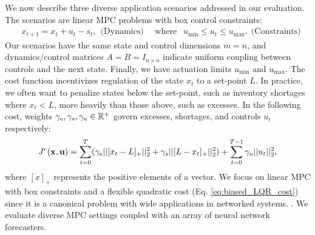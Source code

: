 We now describe three diverse application scenarios addressed in our evaluation. The scenarios
are linear MPC problems with box control constraints:
\begin{align}
    & x_{t+1} = x_{t} + u_t - s_t, ~~\text{(Dynamics)}  \quad{\text{~where~}} ~~
    u_{\text{min}} \leq u_t \leq u_{\text{max}}. ~~\text{(Constraints)} \label{eq:dynamics_MPC}
\end{align}
Our scenarios have the same state and control dimensions $m=n$, and dynamics/control matrices $A=B=I_{n \times n}$ indicate uniform coupling between controls and the next state. Finally, we have actuation limits $u_{\text{min}}$ and $u_{\text{max}}$. The cost function incentivizes regulation of the state $x_t$ to a set-point $L$. In practice, we often want to penalize states below the set-point, such as inventory shortages where $x_t < L$, more heavily than those above, such as excesses. In the following cost, weights $\gamma_e, \gamma_s, \gamma_u \in \mathbb{R}^{+}$ govern excesses, shortages, and controls $u_t$ respectively:
\begin{align}
    J^{\mathrm{c}}(\bold{x}, \bold{u}) = \sum_{t=0}^{T} (\gamma_e \vert\vert [x_t - L]_{+} \vert\vert^2_2 + \gamma_s \vert\vert [L - x_t]_{+} \vert\vert^2_2)  + \sum_{t=0}^{T-1} \gamma_u \vert\vert u_t \vert\vert^2_2,
\label{eq:biased_LQR_cost}
\end{align}
where $[x]_{+}$ represents the positive elements of a vector. We focus on linear MPC with box constraints and a flexible quadratic cost (Eq. \ref{eq:biased_LQR_cost}) since it is a canonical problem \cite{Camacho2013,borrelli2017predictive} with wide applications in networked systems. .
We evaluate diverse MPC settings coupled with an array of neural network forecasters.
